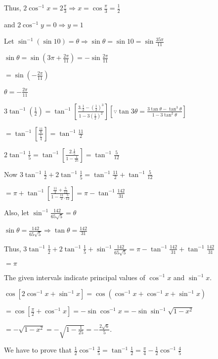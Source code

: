   Thus, $2\cos^{-1}x = 2\frac{\pi}{3} \Rightarrow x = \cos\frac{\pi}{3} = \frac{1}{2}$

  and $2\cos^{-1}y = 0 \Rightarrow y = 1$

\item Let $\sin^{-1}(\sin10) = \theta \Rightarrow \sin\theta = \sin10 = \sin\frac{35\pi}{11}$

  $\sin\theta = \sin\left(3\pi + \frac{2\pi}{11}\right) = -\sin\frac{2\pi}{11}$

  $= \sin\left(-\frac{2\pi}{11}\right)$

  $\theta = -\frac{2\pi}{11}$

\item $3\tan^{-1}\left(\frac{1}{2}\right) = \tan^{-1}\left[\frac{3.\frac{1}{2} - \left(\frac{1}{2}\right)^3}{1 -
    3\left(\frac{1}{2}\right)^2}\right]\left[\because \tan3\theta = \frac{3\tan\theta - \tan^3\theta}{1 - 3\tan^2\theta}\right]$

  $= \tan^{-1}\left[\frac{\frac{11}{8}}{\frac{1}{4}}\right] = \tan^{-1}\frac{11}{2}$

  $2\tan^{-1}\frac{1}{5} = \tan^{-1}\left[\frac{2.\frac{1}{5}}{1 - \frac{1}{25}}\right] = \tan^{-1}\frac{5}{12}$

  Now $3\tan^{-1}\frac{1}{2} + 2\tan^{-1}\frac{1}{5} = \tan^{-1}\frac{11}{2} + \tan^{-1}\frac{5}{12}$

  $= \pi + \tan^{-1}\left[\frac{\frac{11}{2} + \frac{5}{12}}{1- \frac{11}{2}.\frac{5}{12}}\right] = \pi -
  \tan^{-1}\frac{142}{31}$

  Also, let $\sin^{-1}\frac{142}{65\sqrt{5}} = \theta$

  $\sin\theta = \frac{142}{65\sqrt{5}} \Rightarrow \tan\theta = \frac{142}{31}$

  Thus, $3\tan^{-1}\frac{1}{2} + 2\tan^{-1}\frac{1}{5} + \sin^{-1}\frac{142}{65\sqrt{5}} = \pi - \tan^{-1}\frac{142}{31} +
  \tan^{-1}\frac{142}{31}$

  $= \pi$

\item The given intervals indicate principal values of $\cos^{-1}x$ and $\sin^{-1}x$.

  $\cos[2\cos^{-1}x + \sin^{-1}x] = \cos(\cos^{-1}x + \cos^{-1}x + \sin^{-1}x)$

  $= \cos\left[\frac{\pi}{2} + \cos^{-1}x\right] = -\sin\cos^{-1}x = -\sin\sin^{-1}\sqrt{1 - x^2}$

  $= -\sqrt{1 - x^2} = -\sqrt{1 - \frac{1}{25}} = -\frac{2\sqrt{6}}{5}$.

\item We have to prove that $\frac{1}{2}\cos^{-1}\frac{3}{5} = \tan^{-1}\frac{1}{2} = \frac{\pi}{4} -
  \frac{1}{2}\cos^{-1}\frac{4}{5}$

